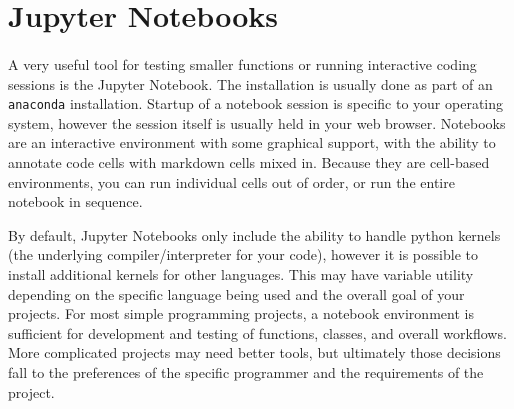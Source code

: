 \section{Jupyter Notebooks}
\paragraph{}A very useful tool for testing smaller functions or running interactive coding sessions is the Jupyter Notebook.
The installation is usually done as part of an \texttt{anaconda} installation.
Startup of a notebook session is specific to your operating system, however the session itself is usually held in your web browser.
Notebooks are an interactive environment with some graphical support, with the ability to annotate code cells with markdown cells mixed in.
Because they are cell-based environments, you can run individual cells out of order, or run the entire notebook in sequence.

By default, Jupyter Notebooks only include the ability to handle python kernels (the underlying compiler/interpreter for your code), however it is possible to install additional kernels for other languages.
This may have variable utility depending on the specific language being used and the overall goal of your projects.
For most simple programming projects, a notebook environment is sufficient for development and testing of functions, classes, and overall workflows.
More complicated projects may need better tools, but ultimately those decisions fall to the preferences of the specific programmer and the requirements of the project.